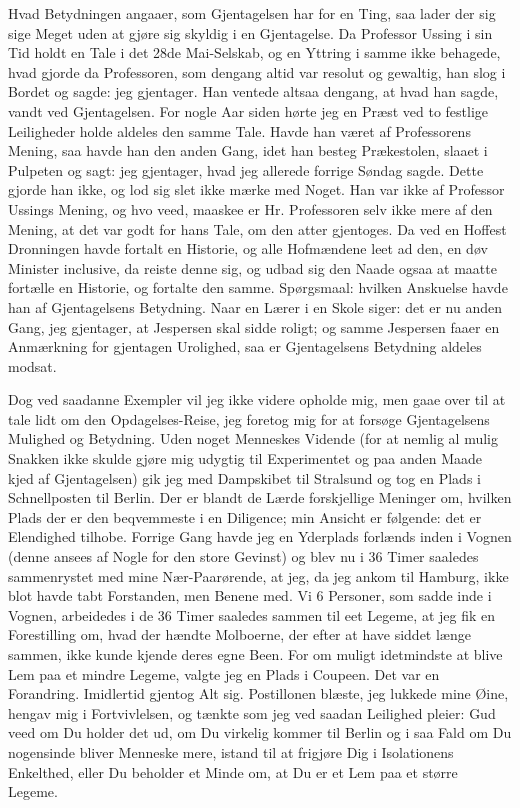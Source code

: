 \documentclass[12pt,a4paper]{article}
\begin{document}
Hvad Betydningen angaaer, som Gjentagelsen har for en Ting, saa lader der sig sige Meget uden at gjøre sig skyldig i en Gjentagelse. Da Professor Ussing i sin Tid holdt en Tale i det 28de Mai-Selskab, og en Yttring i samme ikke behagede, hvad gjorde da Professoren, som dengang altid var resolut og gewaltig, han slog i Bordet og sagde: jeg gjentager. Han ventede altsaa dengang, at hvad han sagde, vandt ved Gjentagelsen. For nogle Aar siden hørte jeg en Præst ved to festlige Leiligheder holde aldeles den samme Tale. Havde han været af Professorens Mening, saa havde han den anden Gang, idet han besteg Prækestolen, slaaet i Pulpeten og sagt: jeg gjentager, hvad jeg allerede forrige Søndag sagde. Dette gjorde han ikke, og lod sig slet ikke mærke med Noget. Han var ikke af Professor Ussings Mening, og hvo veed, maaskee er Hr. Professoren selv ikke mere af den Mening, at det var godt for hans Tale, om den atter gjentoges. Da ved en Hoffest Dronningen havde fortalt en Historie, og alle Hofmændene leet ad den, en døv Minister inclusive, da reiste denne sig, og udbad sig den Naade ogsaa at maatte fortælle en Historie, og fortalte den samme. Spørgsmaal: hvilken Anskuelse havde han af Gjentagelsens Betydning. Naar en Lærer i en Skole siger: det er nu anden Gang, jeg gjentager, at Jespersen skal sidde roligt; og samme Jespersen faaer en Anmærkning for gjentagen Urolighed, saa er Gjentagelsens Betydning aldeles modsat.

Dog ved saadanne Exempler vil jeg ikke videre opholde mig, men gaae over til at tale lidt om den Opdagelses-Reise, jeg foretog mig for at forsøge Gjentagelsens Mulighed og Betydning. Uden noget Menneskes Vidende (for at nemlig al mulig Snakken ikke skulde gjøre mig udygtig til Experimentet og paa anden Maade kjed af Gjentagelsen) gik jeg med Dampskibet til Stralsund og tog en Plads i Schnellposten til Berlin. Der er blandt de Lærde forskjellige Meninger om, hvilken Plads der er den beqvemmeste i en Diligence; min Ansicht er følgende: det er Elendighed tilhobe. Forrige Gang havde jeg en Yderplads forlænds inden i Vognen (denne ansees af Nogle for den store Gevinst) og blev nu i 36 Timer saaledes sammenrystet med mine Nær-Paarørende, at jeg, da jeg ankom til Hamburg, ikke blot havde tabt Forstanden, men Benene med. Vi 6 Personer, som sadde inde i Vognen, arbeidedes i de 36 Timer saaledes sammen til eet Legeme, at jeg fik en Forestilling om, hvad der hændte Molboerne, der efter at have siddet længe sammen, ikke kunde kjende deres egne Been. For om muligt idetmindste at blive Lem paa et mindre Legeme, valgte jeg en Plads i Coupeen. Det var en Forandring. Imidlertid gjentog Alt sig. Postillonen blæste, jeg lukkede mine Øine, hengav mig i Fortvivlelsen, og tænkte som jeg ved saadan Leilighed pleier: Gud veed om Du holder det ud, om Du virkelig kommer til Berlin og i saa Fald om Du nogensinde bliver Menneske mere, istand til at frigjøre Dig i Isolationens Enkelthed, eller Du beholder et Minde om, at Du er et Lem paa et større Legeme.
\end{document}
